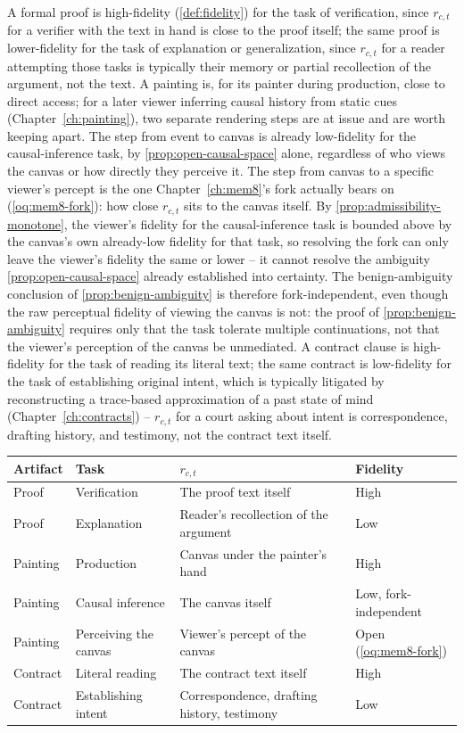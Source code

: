 A formal proof is high-fidelity (\cref{def:fidelity}) for the task of
verification, since $r_{c,t}$ for a verifier with the text in hand is
close to the proof itself; the same proof is lower-fidelity for the task
of explanation or generalization, since $r_{c,t}$ for a reader attempting
those tasks is typically their memory or partial recollection of the
argument, not the text. A painting is, for its painter during production,
close to direct access; for a later viewer inferring causal history from
static cues (Chapter~\ref{ch:painting}), two separate rendering steps are
at issue and are worth keeping apart. The step from event to canvas is
already low-fidelity for the causal-inference task, by
\cref{prop:open-causal-space} alone, regardless of who views the canvas
or how directly they perceive it. The step from canvas to a specific
viewer's percept is the one Chapter~\ref{ch:mem8}'s fork actually bears
on (\cref{oq:mem8-fork}): how close $r_{c,t}$ sits to the canvas itself.
By \cref{prop:admissibility-monotone}, the viewer's fidelity for the
causal-inference task is bounded above by the canvas's own already-low
fidelity for that task, so resolving the fork can only leave the
viewer's fidelity the same or lower -- it cannot resolve the ambiguity
\cref{prop:open-causal-space} already established into certainty. The
benign-ambiguity conclusion of \cref{prop:benign-ambiguity} is therefore
fork-independent, even though the raw perceptual fidelity of viewing the
canvas is not: the proof of \cref{prop:benign-ambiguity} requires only
that the task tolerate multiple continuations, not that the viewer's
perception of the canvas be unmediated. A contract clause is
high-fidelity for the task of reading its literal text; the same
contract is low-fidelity for the task of establishing original intent,
which is typically litigated by reconstructing a trace-based
approximation of a past state of mind (Chapter~\ref{ch:contracts}) --
$r_{c,t}$ for a court asking about intent is correspondence, drafting
history, and testimony, not the contract text itself.

\begin{center}
\small
\begin{tabular}{p{1.4cm}p{2.0cm}p{2.6cm}p{2.6cm}}
\toprule
Artifact & Task & $r_{c,t}$ & Fidelity \\
\midrule
Proof & Verification & The proof text itself & High \\
Proof & Explanation & Reader's recollection of the argument & Low \\
Painting & Production & Canvas under the painter's hand & High \\
Painting & Causal inference & The canvas itself & Low, fork-independent \\
Painting & Perceiving the canvas & Viewer's percept of the canvas & Open (\cref{oq:mem8-fork}) \\
Contract & Literal reading & The contract text itself & High \\
Contract & Establishing intent & Correspondence, drafting history, testimony & Low \\
\bottomrule
\end{tabular}
\end{center}

